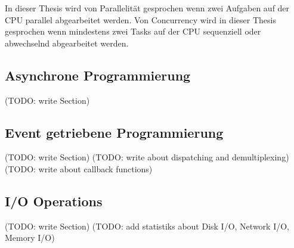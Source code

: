 In dieser Thesis wird von Parallelität gesprochen wenn zwei Aufgaben auf der CPU parallel abgearbeitet werden. Von Concurrency wird in dieser Thesis gesprochen wenn mindestens zwei Tasks auf der CPU sequenziell oder abwechselnd abgearbeitet werden.


\subsection{Asynchrone Programmierung}
(TODO: write Section)

\subsection{Event getriebene Programmierung}
(TODO: write Section)
(TODO: write about dispatching and demultiplexing)
(TODO: write about callback functions)


\subsection{I/O Operations}
(TODO: write Section)
(TODO: add statistiks about Disk I/O, Network I/O, Memory I/O)